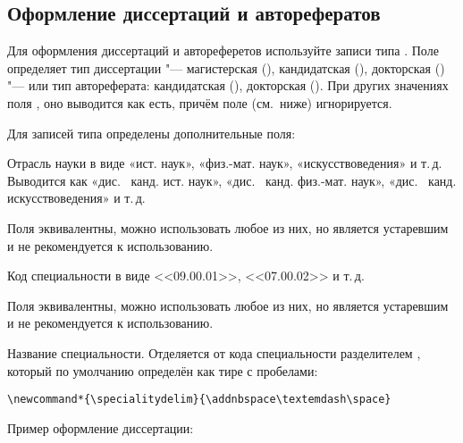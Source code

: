 \documentclass[10pt,a4paper,headings=small,numbers=enddot,english,russian]{ltxdockit}
\newcommand*{\noitemspace}{\vspace{-\itemsep}\vspace{-\parsep}\vspace{-.6ex}}
\begin{document}
\subsection{Оформление диссертаций и авторефератов}
\label{sec:dissers}

Для оформления диссертаций и автореферетов используйте записи типа .  
Поле  определяет тип диссертации "--- магистерская (),
кандидатская (), докторская () "--- или тип автореферата:
кандидатская (), докторская ().
При других значениях поля , оно выводится как есть, причём поле
 (см.~ниже) игнорируется.

Для записей типа  определены дополнительные поля:

\begin{fieldlist}

\noitemspace%

Отрасль науки в виде «ист. наук», «физ.-мат. наук», «искусствоведения» и т.\,д.
Выводится как «дис. \textellipsis\ канд. ист. наук», «дис. \textellipsis\
канд. физ.-мат. наук», «дис. \textellipsis\ канд. искусствоведения» и т.\,д.

Поля эквивалентны, можно использовать любое из них, но  является
устаревшим и не рекомендуется к использованию.

\noitemspace%
\noitemspace%

Код специальности в виде <<09.00.01>>, <<07.00.02>> и т.\,д.

Поля эквивалентны, можно использовать любое из них, но  является
устаревшим и не рекомендуется к использованию.


Название специальности.  
Отделяется от кода специальности разделителем , который по умолчанию
определён как тире с пробелами:

\begin{lstlisting}[style=latex]
\newcommand*{\specialitydelim}{\addnbspace\textemdash\space}
\end{lstlisting}

\end{fieldlist}

Пример оформление диссертации:
\end{document}
